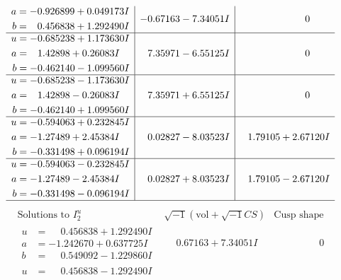 \documentclass[1p]{elsarticle_modified}
\theoremstyle{definition}
\newcommand{\I}{\sqrt{-1}}
\begin{document}
$$\begin{array}{c|c|c}
\begin{aligned}
a &= -0.926899 + 0.049173 I \\
b &= \phantom{-}0.456838 + 1.292490 I\end{aligned}
 & -0.67163 - 7.34051 I & \phantom{-0.000000 } 0 \\ \hline\begin{aligned}
u &= -0.685238 + 1.173630 I \\
a &= \phantom{-}1.42898 + 0.26083 I \\
b &= -0.462140 - 1.099560 I\end{aligned}
 & \phantom{-}7.35971 - 6.55125 I & \phantom{-0.000000 } 0 \\ \hline\begin{aligned}
u &= -0.685238 - 1.173630 I \\
a &= \phantom{-}1.42898 - 0.26083 I \\
b &= -0.462140 + 1.099560 I\end{aligned}
 & \phantom{-}7.35971 + 6.55125 I & \phantom{-0.000000 } 0 \\ \hline\begin{aligned}
u &= -0.594063 + 0.232845 I \\
a &= -1.27489 + 2.45384 I \\
b &= -0.331498 + 0.096194 I\end{aligned}
 & \phantom{-}0.02827 - 8.03523 I & \phantom{-}1.79105 + 2.67120 I \\ \hline\begin{aligned}
u &= -0.594063 - 0.232845 I \\
a &= -1.27489 - 2.45384 I \\
b &= -0.331498 - 0.096194 I\end{aligned}
 & \phantom{-}0.02827 + 8.03523 I & \phantom{-}1.79105 - 2.67120 I\\
 \hline 
 \end{array}$$\newpage$$\begin{array}{c|c|c}  
\text{Solutions to }I^u_{2}& \I (\text{vol} + \sqrt{-1}CS) & \text{Cusp shape}\\
 \hline 
\begin{aligned}
u &= \phantom{-}0.456838 + 1.292490 I \\
a &= -1.242670 + 0.637725 I \\
b &= \phantom{-}0.549092 - 1.229860 I\end{aligned}
 & \phantom{-}0.67163 + 7.34051 I & \phantom{-0.000000 } 0 \\ \hline\begin{aligned}
u &= \phantom{-}0.456838 - 1.292490 I \\

\end{aligned}
\end{array}$$
\end{document}

